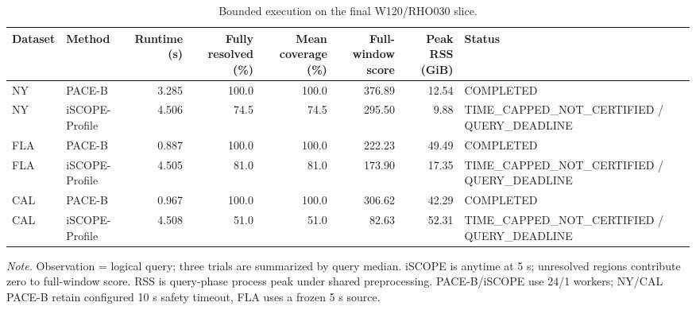 \begin{table}[t]
\centering
\caption{Bounded execution on the final W120/RHO030 slice.}
\begin{tabular}{llrrrrrl}
\toprule
Dataset & Method & Runtime (s) & Fully resolved (\%) & Mean coverage (\%) & Full-window score & Peak RSS (GiB) & Status \\
\midrule
NY & PACE-B & 3.285 & 100.0 & 100.0 & 376.89 & 12.54 & COMPLETED \\
NY & iSCOPE-Profile & 4.506 & 74.5 & 74.5 & 295.50 & 9.88 & TIME\_CAPPED\_NOT\_CERTIFIED / QUERY\_DEADLINE \\
FLA & PACE-B & 0.887 & 100.0 & 100.0 & 222.23 & 49.49 & COMPLETED \\
FLA & iSCOPE-Profile & 4.505 & 81.0 & 81.0 & 173.90 & 17.35 & TIME\_CAPPED\_NOT\_CERTIFIED / QUERY\_DEADLINE \\
CAL & PACE-B & 0.967 & 100.0 & 100.0 & 306.62 & 42.29 & COMPLETED \\
CAL & iSCOPE-Profile & 4.508 & 51.0 & 51.0 & 82.63 & 52.31 & TIME\_CAPPED\_NOT\_CERTIFIED / QUERY\_DEADLINE \\
\bottomrule
\end{tabular}
\end{table}
\textit{Note.} Observation = logical query; three trials are summarized by query median. iSCOPE is anytime at 5 s; unresolved regions contribute zero to full-window score. RSS is query-phase process peak under shared preprocessing. PACE-B/iSCOPE use 24/1 workers; NY/CAL PACE-B retain configured 10 s safety timeout, FLA uses a frozen 5 s source.
